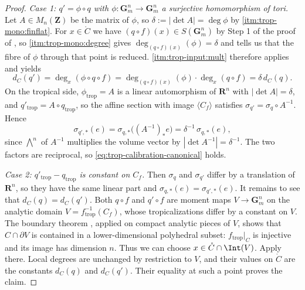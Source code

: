\begin{proof}
\emph{Case 1: $q'=\phi\circ q$ with $\phi:\mathbf G_m^n\to\mathbf G_m^n$ a
surjective homomorphism of tori.} Let $A\in M_n(\mathbf Z)$ be the matrix of
$\phi$, so $\delta:=|\det A|=\deg\phi$ by
 \cref{itm:trop-mono:finflat}. For
$x\in\mathring C$ we have $(q\circ f)(x)\in S(\mathbf G_m^n)$ by Step 1 of
the proof of , so
 \cref{itm:trop-mono:degree} gives
$\deg_{(q\circ f)(x)}(\phi)=\delta$ and tells us that the fibre of $\phi$
through that point is reduced. 
\cref{itm:trop-input:mult} therefore applies and yields
\[
 d_C(q')=\deg_x(\phi\circ q\circ f)
 =\deg_{(q\circ f)(x)}(\phi)\cdot\deg_x(q\circ f)
 =\delta\,d_C(q).
\]
On the tropical side, $\phi_{\mathrm{trop}}=A$ is a linear automorphism of
$\mathbf R^n$ with $|\det A|=\delta$, and
$q'_{\mathrm{trop}}=A\circ q_{\mathrm{trop}}$, so the affine section with
image $\langle C_f\rangle$ satisfies
$\sigma_{q'}=\sigma_q\circ A^{-1}$. Hence
\[
 \sigma_{q',*}(e)=\sigma_{q,*}\bigl((A^{-1})_*e\bigr)
 =\delta^{-1}\,\sigma_{q,*}(e),
\]
since $\bigwedge^n$ of $A^{-1}$ multiplies the volume vector by
$|\det A^{-1}|=\delta^{-1}$. The two factors are reciprocal, so
\eqref{eq:trop-calibration-canonical} holds.

\emph{Case 2: $q'_{\mathrm{trop}}-q_{\mathrm{trop}}$ is constant on $C_f$.}
Then $\sigma_q$ and $\sigma_{q'}$ differ by a translation of
$\mathbf R^n$, so they have the same linear part and
$\sigma_{q,*}(e)=\sigma_{q',*}(e)$. It remains to see that
$d_C(q)=d_C(q')$. Both $q\circ f$ and $q'\circ f$ are moment maps
$V\to\mathbf G_m^n$ on the analytic domain
$V=f_{\mathrm{trop}}^{-1}(C_f)$, whose tropicalizations differ by a
constant on $V$. The boundary theorem
, applied on compact analytic pieces of $V$,
shows that $C\cap\partial V$ is contained in a lower-dimensional
polyhedral subset: $f_{\mathrm{trop}}|_C$ is injective and its image has
dimension $n$. Thus we can choose $x\in\mathring C\cap\Int(V)$.
Apply  there. Local degrees are unchanged
by restriction to $V$, and their values on $\mathring C$ are the constants
$d_C(q)$ and $d_C(q')$. Their equality at such a point proves the claim.


\end{proof}
